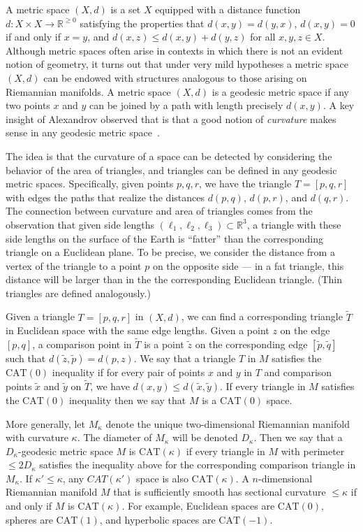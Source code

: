 \documentclass[a4paper,11pt]{article}
\newcommand{\CAT}{\textrm{CAT}}
\begin{document}
A metric space $(X,d)$ is a set $X$ equipped with a distance function $d \colon X \times X \to \mathbb{R}^{\geq 0}$ satisfying the properties that $d(x,y) = d(y,x)$, $d(x,y) = 0$ if and only if $x = y$, and $d(x,z) \leq d(x,y) + d(y,z)$ for all $x,y,z \in X$.
Although metric spaces often arise in contexts in which there is not an evident notion of geometry, it turns out that under very mild hypotheses a metric space $(X,d)$ can be endowed with structures analogous to those arising on Riemannian manifolds.
A metric space $(X,d)$ is a geodesic metric space if any two points $x$ and $y$ can be joined by a path with length precisely $d(x,y)$.
A key insight of Alexandrov observed that is that a good notion of {\em curvature} makes sense in any geodesic metric space~\cite{alexandrov1957uber}.

The idea is that the curvature of a space can be detected by considering the behavior of the area of triangles, and triangles can be defined in any geodesic metric spaces.
Specifically, given points $p, q, r$, we have the triangle $T = [p,q,r]$ with edges the paths that realize the distances $d(p,q)$, $d(p,r)$, and $d(q,r)$.
The connection between curvature and area of triangles comes from the observation that given side lengths $(\ell_1, \ell_2, \ell_3) \subset \mathbb{R}^3$, a triangle with these side lengths on the surface of the Earth is ``fatter'' than the corresponding triangle on a Euclidean plane.
To be precise, we consider the distance from a vertex of the triangle to a point $p$ on the opposite side --- in a fat triangle, this distance will be larger than in the the corresponding Euclidean triangle. (Thin triangles are defined analogously.)

Given a triangle $T=[p,q,r]$ in $(X,d)$, we can find a corresponding triangle $\tilde{T}$ in Euclidean space with the same edge lengths.
Given a point $z$ on the edge $[p,q]$, a comparison point in $\tilde{T}$ is a point $\tilde{z}$ on the corresponding edge $[\tilde{p}, \tilde{q}]$ such that $d(\tilde{z}, \tilde{p}) = d(p,z)$.
We say that a triangle $T$ in $M$ satisfies the $\CAT(0)$ inequality if for every pair of points $x$ and $y$ in $T$ and comparison points $\tilde{x}$ and $\tilde{y}$ on $\tilde{T}$, we have $d(x,y) \leq d(\tilde{x}, \tilde{y})$.
If every triangle in $M$ satisfies the $\CAT(0)$ inequality then we say that $M$ is a $\CAT(0)$ space.

More generally, let $M_{\kappa}$ denote the unique two-dimensional Riemannian manifold with curvature $\kappa$.
The diameter of $M_{\kappa}$ will be denoted $D_{\kappa}$.
Then we say that a $D_{\kappa}$-geodesic metric space $M$ is $\CAT(\kappa)$ if every triangle in $M$ with perimeter $\leq 2D_{\kappa}$ satisfies the inequality above for the corresponding comparison triangle in $M_{\kappa}$.
If $\kappa' \leq \kappa$, any $CAT(\kappa')$ space is also $\CAT(\kappa)$.
A $n$-dimensional Riemannian manifold $M$ that is sufficiently smooth has sectional curvature $\leq \kappa$ if and only if $M$ is $\CAT(\kappa)$.
For example, Euclidean spaces are $\CAT(0)$, spheres are $\CAT(1)$, and hyperbolic spaces are $\CAT(-1)$.
\end{document}
